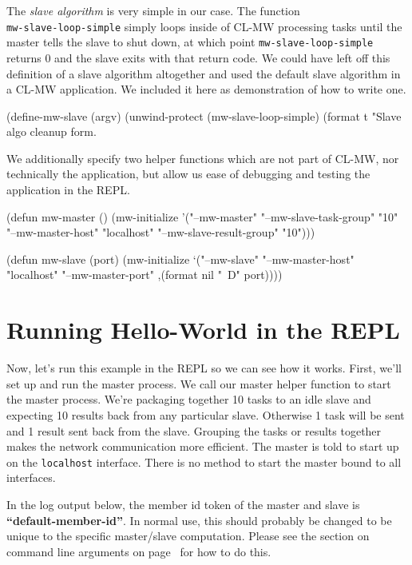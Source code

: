 \documentclass[titlepage,12pt]{book}
\newcommand{\xsmall}{\latexhtml{\small}{}}
\newcommand{\xnormalsize}{\latexhtml{\normalsize}{}}
\newcommand{\clmw}{\xsmall\textsc{CL-MW}\xnormalsize\xspace}
\newcommand{\sa}{\textit{slave algorithm}\xspace}
\newcommand{\func}[1]{\mbox{\texttt{#1}}\xspace}
\newcommand{\file}[1]{\texttt{#1}\xspace}
\newcommand{\bold}[1]{\textbf{#1}\xspace}
\begin{document}
The \sa is very simple in our case. The function\\
\func{mw-slave-loop-simple} simply loops inside of \clmw processing
tasks until the master tells the slave to shut down, at which point
\func{mw-slave-loop-simple} returns 0 and the slave exits with
that return code. We could have left off this definition of a slave
algorithm altogether and used the default slave algorithm in a \clmw
application. We included it here as demonstration of how to write one.

\begin{lisp}[caption=\file{hello-world.lisp: \bold{Part 3 of 4}}]
(define-mw-slave (argv)
  (unwind-protect
       (mw-slave-loop-simple)
    (format t "Slave algo cleanup form.~%
\end{lisp}

We additionally specify two helper functions which are not part of
\clmw, nor technically the application, but allow us ease of debugging
and testing the application in the REPL.

\begin{lisp}[caption=\file{hello-world.lisp: \bold{Part 4 of 4}}]
(defun mw-master ()
  (mw-initialize 
    '("--mw-master" "--mw-slave-task-group" "10"
                    "--mw-master-host" "localhost"
                    "--mw-slave-result-group" "10")))

(defun mw-slave (port)
  (mw-initialize 
    `("--mw-slave" "--mw-master-host" "localhost"
                   "--mw-master-port"
                   ,(format nil "~D" port))))
\end{lisp}

\section{Running Hello-World in the REPL}

Now, let's run this example in the REPL so we can see how it
works. First, we'll set up and run the master process. We call our
master helper function to start the master process.  We're packaging
together 10 tasks to an idle slave and expecting 10 results back from
any particular slave. Otherwise 1 task will be sent and 1 result sent
back from the slave. Grouping the tasks or results together makes the
network communication more efficient.  The master is told to start
up on the \texttt{localhost} interface. There is no method to start
the master bound to all interfaces.

In the log output below, the member id token of the master and
slave is \bold{``default-member-id''}. In normal use, this should
probably be changed to be unique to the specific master/slave
computation. Please see the section on command line arguments on
page~\pageref{command-line-arguments} for how to do this.
\end{document}
